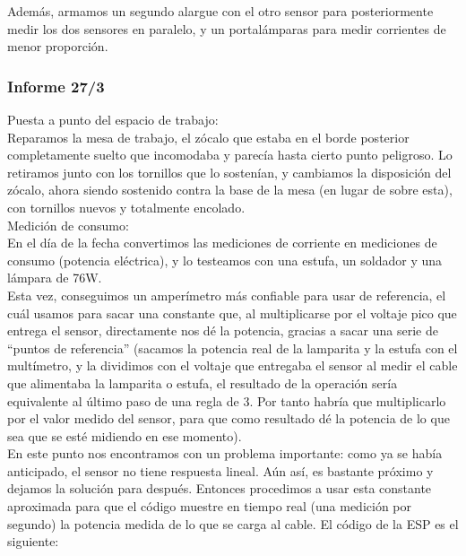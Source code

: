 Además, armamos un segundo alargue con el otro sensor para posteriormente medir los dos sensores en paralelo, y un portalámparas para medir corrientes de menor proporción.\\

\subsubsection{Informe 27/3}

Puesta a punto del espacio de trabajo:\\

Reparamos la mesa de trabajo, el zócalo que estaba en el borde posterior completamente suelto que incomodaba y parecía hasta cierto punto peligroso. Lo retiramos junto con los tornillos que lo sostenían, y cambiamos la disposición del zócalo, ahora siendo sostenido contra la base de la mesa (en lugar de sobre esta), con tornillos nuevos y totalmente encolado.\\

Medición de consumo:\\

En el día de la fecha convertimos las mediciones de corriente en mediciones de consumo (potencia eléctrica), y lo testeamos con una estufa, un soldador y una lámpara de 76W.\\

Esta vez, conseguimos un amperímetro más confiable para usar de referencia, el cuál usamos para sacar una constante que, al multiplicarse por el voltaje pico que entrega el sensor, directamente nos dé la potencia, gracias a sacar una serie de “puntos de referencia” (sacamos la potencia real de la lamparita y la estufa con el multímetro, y la dividimos con el voltaje que entregaba el sensor al medir el cable que alimentaba la lamparita o estufa, el resultado de la operación sería equivalente al último paso de una regla de 3. Por tanto habría que multiplicarlo por el valor medido del sensor, para que como resultado dé la potencia de lo que sea que se esté midiendo en ese momento).\\

En este punto nos encontramos con un problema importante: como ya se había anticipado, el sensor no tiene respuesta lineal. Aún así, es bastante próximo y dejamos la solución para después. Entonces procedimos a usar esta constante aproximada para que el código muestre en tiempo real (una medición por segundo) la potencia medida de lo que se carga al cable. El código de la ESP es el siguiente:\\

